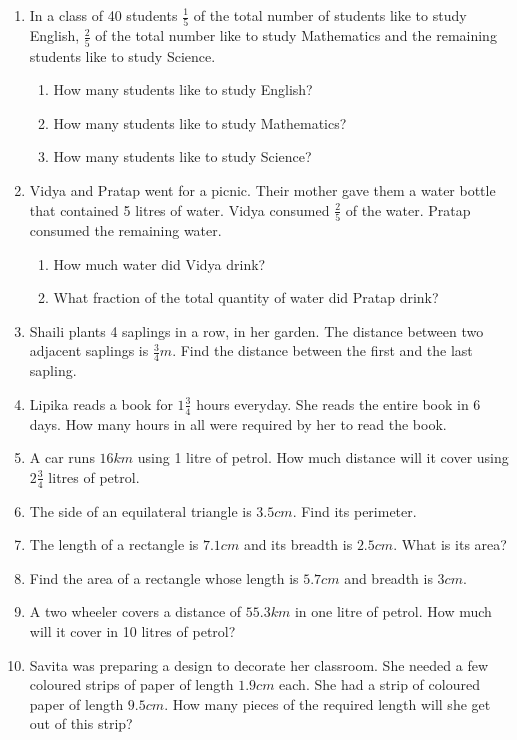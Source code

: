 \begin{enumerate}[label=\thesection.\arabic*,ref=\thesection.\theenumi,resume*]
	\item  In a class of 40 students $\frac{1}{5}$ of the total number of students like to study English, 
$\frac{2}{5}$ of the total number like to study Mathematics and the remaining students like to study Science.
\begin{enumerate}
	\item How many students like to study English?
	\item How many students like to study Mathematics?
	\item How many students like to study Science?
\end{enumerate}
\item Vidya and Pratap went for a picnic.  Their mother gave them a water bottle that contained 5 litres of water.  Vidya consumed $\frac{2}{5}$ of the water.  Pratap consumed the remaining water.
	\begin{enumerate}
		\item How much water did Vidya drink?
		\item What fraction of the total quantity of water did Pratap drink?
	\end{enumerate}
\item Shaili plants 4 saplings in a row, in her garden.  The distance between two adjacent saplings is $\frac{3}{4}m$. Find the distance between the first and the last sapling.
\item Lipika reads a book for $1\frac{3}{4}$ hours everyday.  She reads the entire book in 6 days.  How many hours in all were required by her to read the book.
\item A car runs $16km$ using 1 litre of petrol.  How much distance will it cover using $2\frac{3}{4}$ litres of petrol.
\item The side of an equilateral triangle is $3.5cm$.  Find its perimeter.  
\item The length of a rectangle is $7.1cm$ and its breadth is $2.5cm$.  What is its area?
\item Find the area of a rectangle whose length is $5.7cm$ and breadth is $3cm$. 
\item A two wheeler covers a distance of $55.3km$ in one litre of petrol.  How much will it cover in 10 litres of petrol?
\item Savita was preparing a design to decorate her classroom.  She needed a few coloured strips of paper of length $1.9cm$ each.  She had a strip of coloured paper of length $9.5cm$.  How many pieces of the required length will she get out of this strip? 

\end{enumerate}
